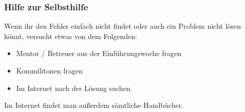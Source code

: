\begin{frame}
    \frametitle{Hilfe zur Selbsthilfe}
    Wenn ihr den Fehler einfach nicht findet oder auch ein Problem nicht lösen könnt, versucht etwas von dem Folgenden:
    \begin{itemize}
        \item Mentor / Betreuer aus der Einführungswoche fragen
        \item Kommilitonen fragen
        \item Im Internet nach der Lösung suchen.
    \end{itemize}
    
    \bigskip
    Im Internet findet man außerdem sämtliche Handbücher.
\end{frame}